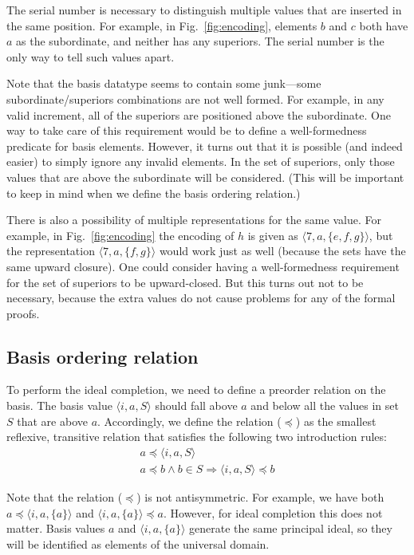 The serial number is necessary to distinguish multiple values that are inserted in the same position. For example, in Fig.~\ref{fig:encoding}, elements $b$ and $c$ both have $a$ as the subordinate, and neither has any superiors. The serial number is the only way to tell such values apart.

Note that the basis datatype seems to contain some junk---some subordinate{\slash}superiors combinations are not well formed. For example, in any valid increment, all of the superiors are positioned above the subordinate. One way to take care of this requirement would be to define a well-formedness predicate for basis elements. However, it turns out that it is possible (and indeed easier) to simply ignore any invalid elements. In the set of superiors, only those values that are above the subordinate will be considered. (This will be important to keep in mind when we define the basis ordering relation.)

There is also a possibility of multiple representations for the same value. For example, in Fig.~\ref{fig:encoding} the encoding of $h$ is given as $\langle 7, a, \{e,f,g\} \rangle$, but the representation $\langle 7, a, \{f,g\} \rangle$ would work just as well (because the sets have the same upward closure). One could consider having a well-formedness requirement for the set of superiors to be upward-closed. But this turns out not to be necessary, because the extra values do not cause problems for any of the formal proofs.

\subsection{Basis ordering relation}

To perform the ideal completion, we need to define a preorder relation on the basis. The basis value $\langle i, a, S \rangle$ should fall above $a$ and below all the values in set $S$ that are above $a$. Accordingly, we define the relation ($\preceq$) as the smallest reflexive, transitive relation that satisfies the following two introduction rules:
%
\begin{align}
\label{eq:preceq-1}
a \preceq \langle i, a, S \rangle \\
\label{eq:preceq-2}
a \preceq b \wedge b \in S \Longrightarrow \langle i, a, S \rangle \preceq b
\end{align}

Note that the relation ($\preceq$) is not antisymmetric. For example, we have both $a \preceq \langle i, a, \{a\} \rangle$ and $\langle i, a, \{a\} \rangle \preceq a$. However, for ideal completion this does not matter. Basis values $a$ and $\langle i, a, \{a\} \rangle$ generate the same principal ideal, so they will be identified as elements of the universal domain.

